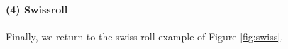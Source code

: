 \documentclass{article} %
\newcommand{\Real}{\mathbb{R}}
\providecommand{\mc}[1]{\mathcal{#1}}
\begin{document}
\paragraph{(4) Swissroll} 
% 
Finally, we return to the swiss roll example of Figure \ref{fig:swiss}.





\end{document}
